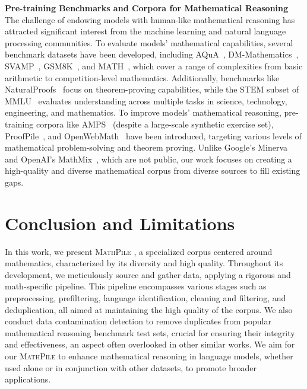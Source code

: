 \textbf{Pre-training Benchmarks and Corpora for Mathematical Reasoning} \quad The challenge of endowing models with human-like mathematical reasoning has attracted significant interest from the machine learning and natural language processing communities. To evaluate models' mathematical capabilities, several benchmark datasets have been developed, including AQuA~\citep{ling-etal-2017-program}, DM-Mathematics~\citep{DBLP:conf/iclr/SaxtonGHK19-deepmind-mathematics}, SVAMP~\citep{patel-etal-2021-nlp},  GSM8K~\citep{DBLP:journals/corr/abs-2110-14168-GSM8K}, and MATH~\citep{DBLP:conf/nips/HendrycksBKABTS21-math}, which cover a range of complexities from basic arithmetic to competition-level mathematics. Additionally, benchmarks like NaturalProofs~\citep{DBLP:conf/nips/Welleck0BHCCC21-naturalproofs} focus on theorem-proving capabilities, while the STEM subset of MMLU~\citep{DBLP:conf/iclr/HendrycksBBZMSS21-MMLU} evaluates understanding across multiple tasks in science, technology, engineering, and mathematics. To improve models' mathematical reasoning, pre-training corpora like AMPS~\citep{DBLP:conf/nips/HendrycksBKABTS21-math} (despite a large-scale synthetic exercise set), ProofPile~\citep{DBLP:journals/corr/abs-2302-12433-proofpile}, and OpenWebMath~\citep{DBLP:journals/corr/abs-2310-06786-openwebmath} have been introduced, targeting various levels of mathematical problem-solving and theorem proving. Unlike Google's Minerva~\citep{DBLP:conf/nips/LewkowyczADDMRS22-minerva} and OpenAI's MathMix~\citep{DBLP:journals/corr/abs-2305-20050-lets-verify-step-by-step}, which are not public, our work focuses on creating a high-quality and diverse mathematical corpus from diverse sources to fill existing gaps.

\section{Conclusion and Limitations}

In this work, we present {\textsc{MathPile }}, a specialized corpus centered around mathematics, characterized by its diversity and high quality. Throughout its development, we meticulously source and gather data, applying a rigorous and math-specific pipeline. This pipeline encompasses various stages such as preprocessing, prefiltering, language identification, cleaning and filtering, and deduplication, all aimed at maintaining the high quality of the corpus. We also conduct data contamination detection to remove duplicates from popular mathematical reasoning benchmark test sets, crucial for ensuring their integrity and effectiveness, an aspect often overlooked in other similar works. We aim for our {\textsc{MathPile }} to enhance mathematical reasoning in language models, whether used alone or in conjunction with other datasets, to promote broader applications.

